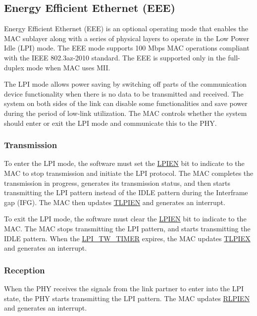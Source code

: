 \documentclass[main\_\_EN.tex]{subfiles}
\begin{document}
\subsection{Energy Efficient Ethernet (EEE) }
Energy Efficient Ethernet (EEE) is an optional operating mode that enables the MAC sublayer along with a series of physical layers to operate in the Low Power Idle (LPI) mode. The EEE mode supports 100 Mbps MAC operations compliant with the IEEE 802.3az-2010 standard. The EEE is supported only in the full-duplex mode when MAC uses MII.

The LPI mode allows power saving by switching off parts of the communication device functionality when there is no data to be transmitted and received. The system on both sides of the link can disable some functionalities and save power during the period of low-link utilization. The MAC controls whether the system should enter or exit the LPI mode and communicate this to the PHY.

\subsubsection{Transmission}

To enter the LPI mode, the software must set the \hyperref[regdesc:EMACLPICSRREG]{LPIEN} bit to
indicate to the MAC to stop transmission and initiate the LPI protocol. The MAC completes the transmission in progress, generates its transmission status, and then starts transmitting the LPI pattern instead of the IDLE pattern during the Interframe gap (IFG). The MAC then updates \hyperref[regdesc:EMACLPICSRREG]{TLPIEN} and generates an interrupt.

To exit the LPI mode, the software must clear the \hyperref[regdesc:EMACLPICSRREG]{LPIEN} bit to
indicate to the MAC. The MAC stops transmitting the LPI pattern, and starts transmitting the IDLE pattern. When the \hyperref[regdesc:EMACLPITIMERSCONTROLREG]{LPI\_TW\_TIMER} expires, the MAC updates \hyperref[regdesc:EMACLPICSRREG]{TLPIEX} and generates an interrupt.


\subsubsection{Reception}

When the PHY receives the signals from the link partner to enter into the LPI state, the PHY starts transmitting the LPI pattern. The MAC updates \hyperref[regdesc:EMACLPICSRREG]{RLPIEN} and generates an interrupt.
\end{document}

